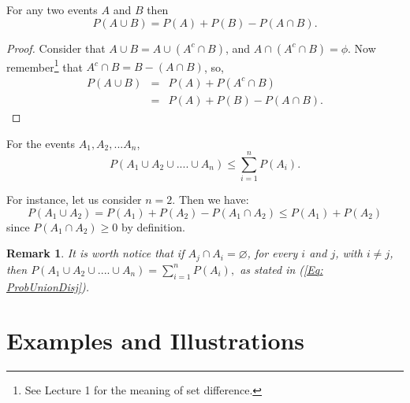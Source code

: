 \documentclass[notes=show,handout]{beamer}\usepackage[]{graphicx}\usepackage[]{color}
\newtheorem{remark}{Remark}[section]
\newcommand{\bea}{\begin{eqnarray}}
\newcommand{\eea}{\end{eqnarray}}
\newcommand{\nn}{\nonumber}
\begin{document}
\begin{frame}{\secname}
  \begin{theorem}
  For any two events $A$ and $B$ then
  $$
  P(A \cup B) = P(A) + P(B) - P(A \cap B).
  $$
  \end{theorem}
  \vspace{0.1cm}
  \begin{footnotesize}
  \begin{proof}
  Consider that $A\cup B = A \cup (A^c \cap B)$, and $A\cap(A^c \cap B) = \phi$. Now remember\footnote{See Lecture 1 for the meaning of set difference.} that $A^c \cap B = B -(A \cap B)$, so,
  \bea
  P(A\cup B) &=& P(A) + P(A^c \cap B) \nn \\
  &=& P(A) + P(B) - P(A\cap B). \nn
  \eea

  \end{proof}
  \end{footnotesize}
\end{frame}


\begin{frame}{\secname}
\begin{theorem} 
For the events $A_1,A_2,... A_n$,
$$
P(A_1 \cup A_2 \cup....\cup A_n) \leq \sum_{i=1}^{n}P(A_i).
$$
\end{theorem}
\vspace{0.1cm}
For instance, let us consider $n=2$. Then we have:
$$
P(A_1 \cup A_2 ) = P(A_1) + P(A_2) - P(A_1 \cap A_2) \leq P(A_1) + P(A_2)
$$
since $P(A_1 \cap A_2) \geq 0$ by definition.
\begin{remark}
It is worth notice that if $A_j \cap A_i = \varnothing$, for every $i$ and $j$, with $i\neq j$, then
$
P(A_1 \cup A_2 \cup....\cup A_n) = \sum_{i=1}^{n}P(A_i),
$
as stated in (\ref{Eq: ProbUnionDisj}).
\end{remark}
\end{frame}



\section{Examples and Illustrations}
\end{document}
